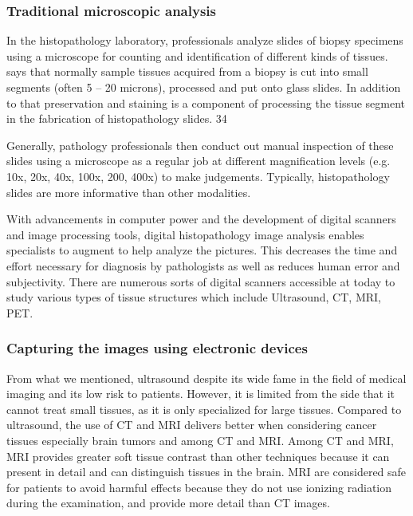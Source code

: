 \subsubsection{Traditional microscopic analysis}
In the histopathology laboratory, professionals analyze slides of biopsy
specimens using a microscope for counting and identification of different
kinds of tissues. says that normally sample tissues acquired from a biopsy
is cut into small segments (often 5 – 20 microns), processed and put onto
glass slides. In addition to that preservation and staining is a component
of processing the tissue segment in the fabrication of histopathology slides.
34

Generally, pathology professionals then conduct out manual inspection of these slides using a microscope as a regular job at different magnification levels (e.g. 10x, 20x, 40x, 100x, 200, 400x) to make judgements. Typically, histopathology slides are more informative than other modalities.

With advancements in computer power and the development of digital
scanners and image processing tools, digital histopathology image analysis
enables specialists to augment to help analyze the pictures. This decreases
the time and effort necessary for diagnosis by pathologists as well as reduces
human error and subjectivity. There are numerous sorts of digital scanners
accessible at today to study various types of tissue structures which include
Ultrasound, CT, MRI, PET.
\subsubsection{Capturing the images using electronic devices}
From what we mentioned, ultrasound despite its wide fame in the field
of medical imaging and its low risk to patients. However, it is limited from
the side that it cannot treat small tissues, as it is only specialized for large
tissues. Compared to ultrasound, the use of CT and MRI delivers better
when considering cancer tissues especially brain tumors and among CT
and MRI. Among CT and MRI, MRI provides greater soft tissue contrast
than other techniques because it can present in detail and can distinguish
tissues in the brain. MRI are considered safe for patients to avoid harmful
effects because they do not use ionizing radiation during the examination,
and provide more detail than CT images.
